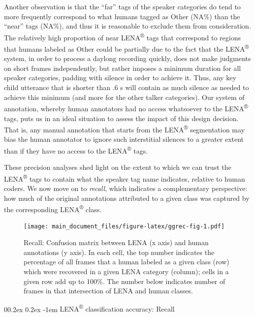\documentclass[english,table,man,floatsintext]{apa6}
\makeatletter
\let\oldparagraph\paragraph
\renewcommand{\paragraph}[1]{\oldparagraph{#1}\mbox{}}
\renewcommand{\paragraph}{\@startsection{paragraph}{4}{\parindent}%
  {0\baselineskip \@plus 0.2ex \@minus 0.2ex}%
  {-1em}%
  {\normalfont\normalsize\bfseries\itshape\typesectitle}}
\makeatother
\begin{document}
Another observation is that the \enquote{far} tags of the speaker categories do tend to more frequently correspond to what humans tagged as Other (NA\%) than the \enquote{near} tags (NA\%), and thus it is reasonable to exclude them from consideration. The relatively high proportion of near LENA\textsuperscript{®} tags that correspond to regions that humans labeled as Other could be partially due to the fact that the LENA\textsuperscript{®} system, in order to process a daylong recording quickly, does not make judgments on short frames independently, but rather imposes a minimum duration for all speaker categories, padding with silence in order to achieve it. Thus, any key child utterance that is shorter than .6 s will contain as much silence as needed to achieve this minimum (and more for the other talker categories). Our system of annotation, whereby human annotators had no access whatsoever to the LENA\textsuperscript{®} tags, puts us in an ideal situation to assess the impact of this design decision. That is, any manual annotation that starts from the LENA\textsuperscript{®} segmentation may bias the human annotator to ignore such interstitial silences to a greater extent than if they have no access to the LENA\textsuperscript{®} tags.

These precision analyses shed light on the extent to which we can trust the LENA\textsuperscript{®} tags to contain what the speaker tag name indicates, relative to human coders. We now move on to \emph{recall}, which indicates a complementary perspective: how much of the original annotations attributed to a given class was captured by the corresponding LENA\textsuperscript{®} class.

\begin{figure}
\centering
\texttt{[image: main\_document\_files/figure-latex/ggrec-fig-1.pdf]}
\caption{\label{fig:ggrec-fig}Recall: Confusion matrix between LENA (x axis) and human annotations (y axis). In each cell, the top number indicates the percentage of all frames that a human labeled as a given class (row) which were recovered in a given LENA category (column); cells in a given row add up to 100\%. The number below indicates number of frames in that intersection of LENA and human classes.}
\end{figure}

\hypertarget{lena-classification-accuracy-recall}{%
\paragraph{\texorpdfstring{LENA\textsuperscript{®} classification accuracy: Recall}{LENA® classification accuracy: Recall}}\label{lena-classification-accuracy-recall}}
\end{document}
